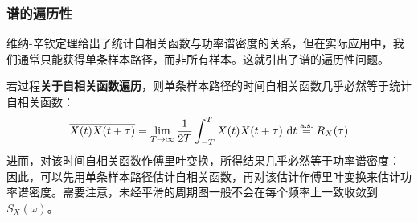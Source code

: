 \subsubsection{谱的遍历性}

维纳-辛钦定理给出了统计自相关函数与功率谱密度的关系，但在实际应用中，我们通常只能获得单条样本路径，而非所有样本。这就引出了谱的遍历性问题。

若过程\textbf{关于自相关函数遍历}，则单条样本路径的时间自相关函数几乎必然等于统计自相关函数：
\[
\overline{X(t)X(t+\tau)} = \lim_{T\to\infty} \frac{1}{2T} \int_{-T}^{T} X(t)X(t+\tau) \, \mathop{}\!\mathrm{d} t \stackrel{\text{a.s.}}{=} R_X(\tau)
\]
进而，对该时间自相关函数作傅里叶变换，所得结果几乎必然等于功率谱密度：
因此，可以先用单条样本路径估计自相关函数，再对该估计作傅里叶变换来估计功率谱密度。需要注意，未经平滑的周期图一般不会在每个频率上一致收敛到$S_X(\omega)$。

